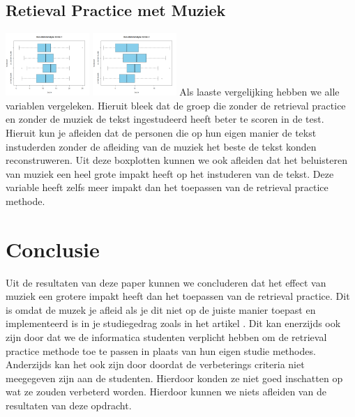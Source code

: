 \documentclass{hogent-article}
\begin{document}
	\subsection{Retieval Practice met Muziek}
	\includegraphics[width=120px]{Rplot_RetrievalPracticeMuziek_Score1}	
	\includegraphics[width=120px]{Rplot_RetrievalPracticeMuziek_Score2}
	Als laaste vergelijking hebben we alle variablen vergeleken. Hieruit bleek dat de groep die zonder de retrieval practice en zonder de muziek de tekst ingestudeerd heeft beter te scoren in de test. Hieruit kun je afleiden dat de personen die op hun eigen manier de tekst instuderden zonder de afleiding van de muziek het beste de tekst konden reconstruweren.
	Uit deze boxplotten kunnen we ook afleiden dat het beluisteren van muziek een heel grote impakt heeft op het instuderen van de tekst. Deze variable heeft zelfs meer impakt dan het toepassen van de retrieval practice methode.  
	
	
	\section{Conclusie}
	Uit de resultaten van deze paper kunnen we concluderen dat het effect van muziek een grotere impakt heeft dan het toepassen van de retrieval practice. Dit is omdat de muzek je afleid als je dit niet op de juiste manier toepast en implementeerd is in je studiegedrag zoals in het artikel \autocite{ChanEtAl1998}. Dit kan enerzijds ook zijn door dat we de informatica studenten verplicht hebben om de retrieval practice methode toe te passen in plaats van hun eigen studie methodes. Anderzijds kan het ook zijn door doordat de verbeterings criteria niet meegegeven zijn aan de studenten. Hierdoor konden ze niet goed inschatten op wat ze zouden verbeterd worden. Hierdoor kunnen we niets afleiden van de resultaten van deze opdracht.
	
	
	\printbibliography[heading=bibintoc]
	
\end{document}

